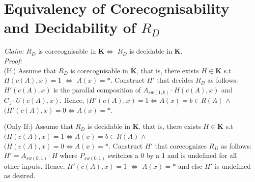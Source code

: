 \documentclass{article}
\newcommand{\K}{$\bm{K}$}
\begin{document}
\section{Equivalency of Corecognisability and Decidability of $R_D$}
\textit{Claim:} $R_D$ is corecognisable in \K{}$\iff{}$ $R_D$ is decidable in \K{}.\\

\noindent{}\textit{Proof:}\\
(If:) Assume that $R_D$ is corecognisable in \K{}, that is, there exists $H\in{}\bm{K}$ s.t $H(c(A), x)=1$ $\iff{}$ $A(x)=*$. Construct $H'$ that decides $R_D$ as follows: $H'(c(A),x)$ is the parallal composition of $A_{sw(1,0)}\cdot{}H(c(A),x)$ and $C_1 \cdot{} U(c(A),x)$. Hence, $(H'(c(A),x)=1\iff{}A(x)=b\in{}R(A)$ $\wedge{}$ $(H'(c(A),x)=0\iff{}A(x)=*$.

\noindent{}(Only If:) Assume that $R_D$ is decidable in \K{}, that is, there exists $H\in{}\bm{K}$ s.t $(H(c(A),x)=1\iff{}A(x)=b\in{}R(A)$ $\wedge{}$ $(H(c(A),x)=0\iff{}A(x)=*$. Construct $H'$ that corecognizes $R_D$ as follows: $H'=A_{sw(0,1)}\cdot{}H$ where $P_{sw(0,1)}$ switches a 0 by a 1 and is undefined for all other inputs. Hence, $H'(c(A), x)=1$ $\iff{}$ $A(x)=*$ and else $H'$ is undefined as desired.  
\end{document}
